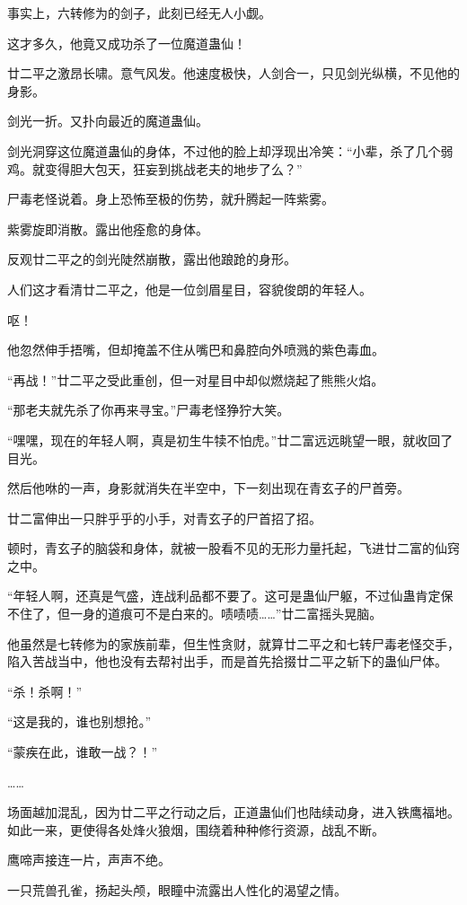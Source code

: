 \begin{this_body}
事实上，六转修为的剑子，此刻已经无人小觑。

这才多久，他竟又成功杀了一位魔道蛊仙！

廿二平之激昂长啸。意气风发。他速度极快，人剑合一，只见剑光纵横，不见他的身影。

剑光一折。又扑向最近的魔道蛊仙。

剑光洞穿这位魔道蛊仙的身体，不过他的脸上却浮现出冷笑：“小辈，杀了几个弱鸡。就变得胆大包天，狂妄到挑战老夫的地步了么？”

尸毒老怪说着。身上恐怖至极的伤势，就升腾起一阵紫雾。

紫雾旋即消散。露出他痊愈的身体。

反观廿二平之的剑光陡然崩散，露出他踉跄的身形。

人们这才看清廿二平之，他是一位剑眉星目，容貌俊朗的年轻人。

呕！

他忽然伸手捂嘴，但却掩盖不住从嘴巴和鼻腔向外喷溅的紫色毒血。

“再战！”廿二平之受此重创，但一对星目中却似燃烧起了熊熊火焰。

“那老夫就先杀了你再来寻宝。”尸毒老怪狰狞大笑。

“嘿嘿，现在的年轻人啊，真是初生牛犊不怕虎。”廿二富远远眺望一眼，就收回了目光。

然后他咻的一声，身影就消失在半空中，下一刻出现在青玄子的尸首旁。

廿二富伸出一只胖乎乎的小手，对青玄子的尸首招了招。

顿时，青玄子的脑袋和身体，就被一股看不见的无形力量托起，飞进廿二富的仙窍之中。

“年轻人啊，还真是气盛，连战利品都不要了。这可是蛊仙尸躯，不过仙蛊肯定保不住了，但一身的道痕可不是白来的。啧啧啧……”廿二富摇头晃脑。

他虽然是七转修为的家族前辈，但生性贪财，就算廿二平之和七转尸毒老怪交手，陷入苦战当中，他也没有去帮衬出手，而是首先拾掇廿二平之斩下的蛊仙尸体。

“杀！杀啊！”

“这是我的，谁也别想抢。”

“蒙疾在此，谁敢一战？！”

……

场面越加混乱，因为廿二平之行动之后，正道蛊仙们也陆续动身，进入铁鹰福地。如此一来，更使得各处烽火狼烟，围绕着种种修行资源，战乱不断。

鹰啼声接连一片，声声不绝。

一只荒兽孔雀，扬起头颅，眼瞳中流露出人性化的渴望之情。


\end{this_body}
